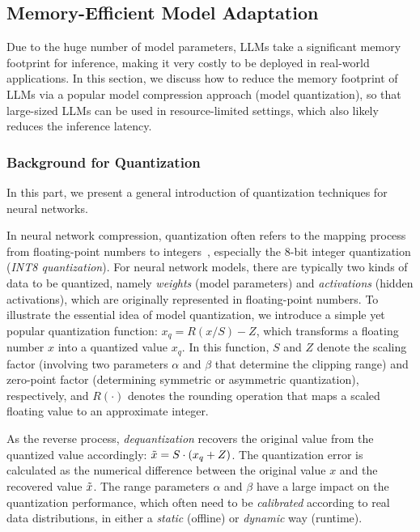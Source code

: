 \subsection{Memory-Efficient Model Adaptation}\label{sec-memory}  

Due to the huge number of model parameters, LLMs take a significant memory footprint for inference, making it very costly to be deployed in real-world applications. In this section, we discuss how to reduce the memory footprint of LLMs via a popular model compression approach (\ie model quantization), so that large-sized LLMs can be used in resource-limited settings, which also likely reduces the inference latency.  


\subsubsection{Background for Quantization} In this part,  we 
present a general introduction of quantization techniques for neural networks. 

In neural network compression, quantization often refers to the mapping process from  floating-point numbers to  integers~\cite{Gholami-CoRR-2022-A}, especially the 8-bit integer quantization (\ie  \emph{INT8 quantization}). 
For neural network models, there are typically two kinds of data to be quantized, namely \emph{weights} (model parameters) and \emph{activations} (hidden activations), which are originally represented in floating-point numbers.  To illustrate the essential idea of model quantization,  we   introduce a simple yet popular quantization function:
$x_q = R(x/S) - Z$, which transforms a floating number $x$ into a quantized value $x_q$. In this function, 
$S$ and $Z$ denote the scaling factor (involving two  parameters $\alpha$ and $\beta$ that determine the clipping range) and zero-point factor (determining symmetric or asymmetric quantization),  respectively, and $R(\cdot)$ denotes the rounding operation that maps a scaled floating value to an approximate integer. 


As the reverse process,  \emph{dequantization}  recovers the original value from the quantized value accordingly: $\Tilde{x} = S\cdot (x_q + Z)$.  The  quantization error is calculated as the numerical difference between the original value $x$ and the recovered value $\Tilde{x}$.  
{The range parameters  $\alpha$ and $\beta$ have a large impact on the quantization  performance}, which often need to be  \emph{calibrated} according to real data distributions, in either a \emph{static} (offline) or \emph{dynamic} way (runtime).

